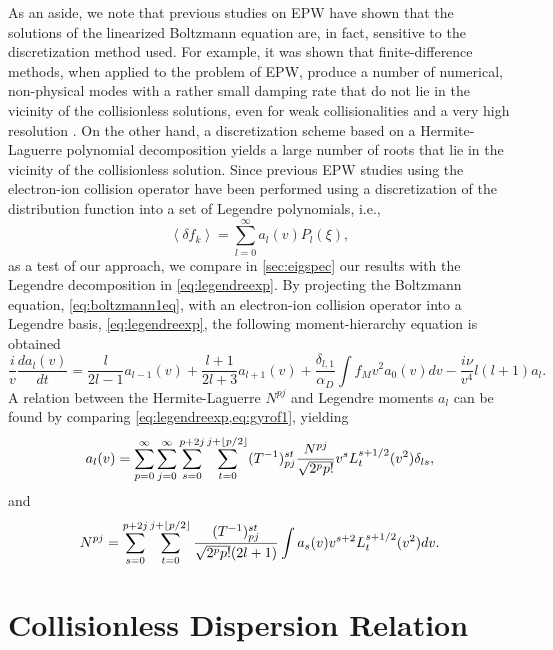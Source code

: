 As an aside, we note that previous studies on EPW have shown that the solutions of the linearized Boltzmann equation are, in fact, sensitive to the discretization method used.
%
{For example, it was shown that finite-difference methods, when applied to the problem of EPW, produce a number of numerical, non-physical modes with a rather small damping rate that do not lie in the vicinity of the collisionless solutions, even for weak collisionalities and a very high resolution \citep{Bratanov2013}}.
%
{On the other hand, {a} discretization scheme based on a Hermite-Laguerre polynomial decomposition yields a large number of roots that lie in the vicinity of the collisionless solution. Since} previous EPW studies using the electron-ion collision operator have been performed using a discretization of the distribution function into a set of Legendre polynomials, i.e., \citep{Epperlein1992,Brantov2012,Banks2016}
%
\begin{equation}
    \left<\delta f_k\right> = \sum_{l=0}^\infty a_l(v) P_l(\xi),
\label{eq:legendreexp}
\end{equation}
%
as a test of our approach, we compare {in \cref{sec:eigspec}} our results with the Legendre decomposition in \cref{eq:legendreexp}.
%
By projecting the Boltzmann equation, \cref{eq:boltzmann1eq}, with an electron-ion collision operator into a Legendre basis, \cref{eq:legendreexp}, the following moment-hierarchy equation is obtained
%
\begin{equation}
    \frac{i}{v}\frac{d a_l(v)}{dt}  =  \frac{l}{2l-1} a_{l-1}(v)+\frac{l+1}{2l+3}a_{l+1}(v)+\frac{\delta_{l,1}}{\alpha_D}\int f_M v^2 a_0(v) dv -  \frac{i \nu}{v^4} l(l+1) a_l.
\label{eq:legmomenthi}
\end{equation}
%
A relation between the Hermite-Laguerre $N^{pj}$ and Legendre moments $a_l$ can be found by comparing \cref{eq:legendreexp,eq:gyrof1}, yielding
%
\begin{equation}
    a_l(v)=\sum_{p=0}^\infty \sum_{j=0}^\infty \sum_{s=0}^{p+2j}\sum_{t=0}^{j+\lfloor p/2\rfloor}(T^{-1})^{st}_{pj}\frac{N^{pj}}{\sqrt{2^p p!}}v^s L_t^{s+1/2}(v^2) \delta_{ls},
\end{equation}
%
and
\begin{equation}
    N^{pj} = \sum_{s=0}^{p+2j}\sum_{t=0}^{j+\lfloor p/2\rfloor}\frac{(T^{-1})^{st}_{pj}}{\sqrt{2^p p!}(2l+1)}\int a_s(v) v^{s+2} L_t^{s+1/2}(v^2) dv.
\end{equation}

\section{Collisionless Dispersion Relation}
\label{sec:collisionless}


